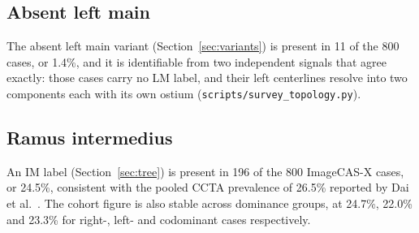 \subsection{Absent left main}

The absent left main variant (Section~\ref{sec:variants}) is present in 11 of the 800 cases, or
1.4\%, and it is identifiable from two independent signals that agree exactly: those cases carry
no LM label, and their left centerlines resolve into two components each with its own ostium
(\texttt{scripts/survey\_topology.py}).

\subsection{Ramus intermedius}

An IM label (Section~\ref{sec:tree}) is present in 196 of the 800 ImageCAS-X cases, or
24.5\%, consistent with the pooled CCTA prevalence of 26.5\% reported by Dai et al.\
\cite{dai2025ramus}.
The cohort figure is also stable across dominance groups, at 24.7\%, 22.0\% and 23.3\% for
right-, left- and codominant cases respectively.
